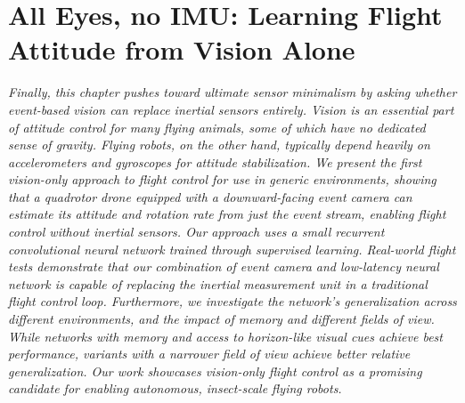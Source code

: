 \chapter{All Eyes, no IMU: Learning Flight Attitude from Vision Alone}
\label{ch:npjr}

{\it
Finally, this chapter pushes toward ultimate sensor minimalism by asking whether event-based vision can replace inertial sensors entirely. Vision is an essential part of attitude control for many flying animals, some of which have no dedicated sense of gravity. Flying robots, on the other hand, typically depend heavily on accelerometers and gyroscopes for attitude stabilization. We present the first vision-only approach to flight control for use in generic environments, showing that a quadrotor drone equipped with a downward-facing event camera can estimate its attitude and rotation rate from just the event stream, enabling flight control without inertial sensors. Our approach uses a small recurrent convolutional neural network trained through supervised learning. Real-world flight tests demonstrate that our combination of event camera and low-latency neural network is capable of replacing the inertial measurement unit in a traditional flight control loop. Furthermore, we investigate the network's generalization across different environments, and the impact of memory and different fields of view. While networks with memory and access to horizon-like visual cues achieve best performance, variants with a narrower field of view achieve better relative generalization. Our work showcases vision-only flight control as a promising candidate for enabling autonomous, insect-scale flying robots.
}


